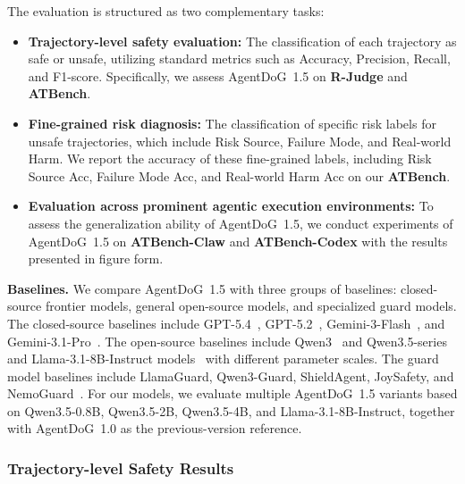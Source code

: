\documentclass{llmxive}
\providecommand{\toolBench}{{ATBench}\xspace}
\providecommand{\agentdog}{AgentDoG~1.5\xspace}
\begin{document}
The evaluation is structured as two complementary tasks:

\begin{itemize}
\item \textbf{Trajectory-level safety evaluation:} The classification of each trajectory as safe or unsafe, utilizing standard metrics such as Accuracy, Precision, Recall, and F1-score. Specifically, we assess \agentdog{} on \textbf{R-Judge} and \textbf{ATBench}.
\item \textbf{Fine-grained risk diagnosis:} The classification of specific risk labels for unsafe trajectories, which include Risk Source, Failure Mode, and Real-world Harm. We report the accuracy of these fine-grained labels, including Risk Source Acc, Failure Mode Acc, and Real-world Harm Acc on our \textbf{\toolBench{}}.
\item \textbf{Evaluation across prominent agentic execution environments:} To assess the generalization ability of \agentdog{}, we conduct experiments of \agentdog{} on \textbf{ATBench-Claw} and \textbf{ATBench-Codex} with the results presented in figure form.
\end{itemize}

\textbf{Baselines.} We compare \agentdog{} with three groups of baselines: closed-source
frontier models, general open-source models, and specialized guard models. The closed-source baselines include GPT-5.4~\citep{openai_gpt54_2026}, GPT-5.2~\citep{openai_gpt52_2025}, Gemini-3-Flash~\citep{googlecloud_gemini3flash_docs_2026}, and Gemini-3.1-Pro~\citep{gemini3}. The open-source baselines include Qwen3~\citep{qwen3} and Qwen3.5-series~\citep{qwen35} and Llama-3.1-8B-Instruct models~\citep{dubey2024llama} with different parameter scales. The guard model baselines include LlamaGuard, Qwen3-Guard, ShieldAgent, JoySafety, and NemoGuard~\citep{inan2023llama, qwen3guard2025, shieldagent2025, jd-opensource2025, nemo_guardrails2023}. For our models, we evaluate multiple \agentdog{} variants based on Qwen3.5-0.8B, Qwen3.5-2B, Qwen3.5-4B, and Llama-3.1-8B-Instruct, together with AgentDoG~1.0 as the previous-version reference.

\subsubsection{Trajectory-level Safety Results}
\end{document}
